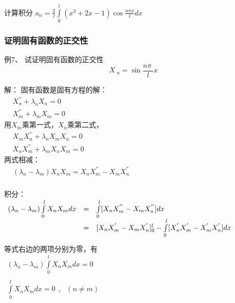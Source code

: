 \begin{frame}
      \frametitle{}
      计算积分 $a_n =\frac{2}{l}\int\limits_{0 }^{l}  (x^3+2x-1) \cos \frac{ n\pi x}{l} dx$ \\
\end{frame}

\begin{frame}
	\frametitle{证明固有函数的正交性}	
	\begin{exampleblock} {例7、	试证明固有函数的正交性}
		\begin{equation*}
			X~_n= \sin \frac{n\pi~}{l} x  
		\end{equation*}
	\end{exampleblock} 	
	\alert{解：} 固有函数是固有方程的解：\\
	$\begin{array}{llll}
		&X_n ^{''}+\lambda_n X_n=0\\
		&X_m ^{''}+\lambda_m X_m=0
	\end{array}$ \\ 
	用$X_m$乘第一式，$X_n$乘第二式，\\
	$\begin{array}{llll}
		&X_m X_n ^{''}+\lambda_n X_m X_n=0\\
		&X_nX_m ^{''}+\lambda_m X_n X_m=0
	\end{array}$ \\ 
	两式相减：\\
	$\begin{array}{llll}
		& (\lambda_n-\lambda_m) X_n X_m= X_nX_m ^{''}-X_mX_n ^{''} 
	\end{array}$ \\ 
\end{frame}	

\begin{frame}
	\frametitle{}	
	积分：\\
	$ \begin{array}{llll}
		(\lambda_n-\lambda_m) \int\limits_{0 }^{l}  X_n X_m dx &= & \int\limits_{0 }^{l}  [X_nX_m ^{''}-X_mX_n ^{''} ] dx\\   \vspace{0.3cm}
		&=&  [X_nX_m ^{'}-X_mX_n ^{'} ]_0 ^{l} - \int\limits_{0 }^{l}  [X_n ^{'} X_m ^{'}-X_m ^{'} X_n ^{'} ] dx \\   
	\end{array}$ \\
	等式右边的两项分别为零，有\\
	$ \begin{array}{llll}
		(\lambda_n-\lambda_m) \int\limits_{0 }^{l}  X_n X_m dx=0 \\   
	\end{array}$ \\
	$ \begin{array}{llll}
		\int\limits_{0 }^{l}  X_n X_m dx=0 ~~,~~~ (n\ne m)\\   
	\end{array}$ 
\end{frame}	

